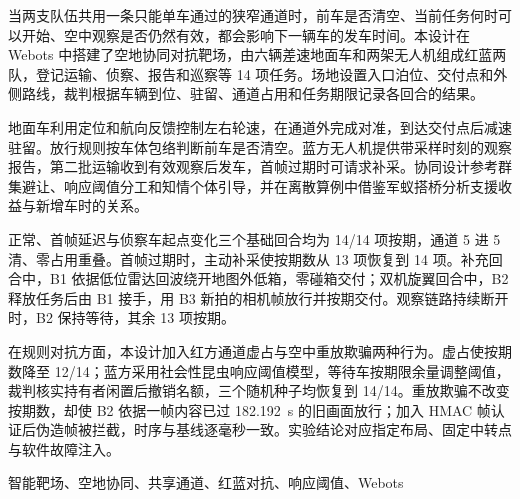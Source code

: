 
当两支队伍共用一条只能单车通过的狭窄通道时，前车是否清空、当前任务何时可以开始、空中观察是否仍然有效，都会影响下一辆车的发车时间。本设计在 Webots 中搭建了空地协同对抗靶场，由六辆差速地面车和两架无人机组成红蓝两队，登记运输、侦察、报告和巡察等 14 项任务。场地设置入口泊位、交付点和外侧路线，裁判根据车辆到位、驻留、通道占用和任务期限记录各回合的结果。

地面车利用定位和航向反馈控制左右轮速，在通道外完成对准，到达交付点后减速驻留。放行规则按车体包络判断前车是否清空。蓝方无人机提供带采样时刻的观察报告，第二批运输收到有效观察后发车，首帧过期时可请求补采。协同设计参考群集避让、响应阈值分工和知情个体引导，并在离散算例中借鉴军蚁搭桥分析支援收益与新增车时的关系。

正常、首帧延迟与侦察车起点变化三个基础回合均为 14/14 项按期，通道 5 进 5 清、零占用重叠。首帧过期时，主动补采使按期数从 13 项恢复到 14 项。补充回合中，B1 依据低位雷达回波绕开地图外低箱，零碰箱交付；双机旋翼回合中，B2 释放任务后由 B1 接手，用 B3 新拍的相机帧放行并按期交付。观察链路持续断开时，B2 保持等待，其余 13 项按期。

在规则对抗方面，本设计加入红方通道虚占与空中重放欺骗两种行为。虚占使按期数降至 12/14；蓝方采用社会性昆虫响应阈值模型，等待车按期限余量调整阈值，裁判核实持有者闲置后撤销名额，三个随机种子均恢复到 14/14。重放欺骗不改变按期数，却使 B2 依据一帧内容已过 182.192~s 的旧画面放行；加入 HMAC 帧认证后伪造帧被拦截，时序与基线逐毫秒一致。实验结论对应指定布局、固定中转点与软件故障注入。

\quad 智能靶场、空地协同、共享通道、红蓝对抗、响应阈值、Webots
